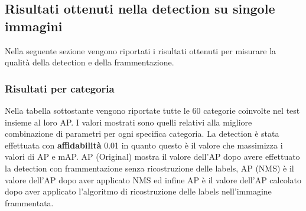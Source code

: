 \subsection{Risultati ottenuti nella detection su singole immagini}
Nella seguente sezione vengono riportati i risultati ottenuti per misurare la qualità della detection e della frammentazione.
\subsubsection{Risultati per categoria}
Nella tabella sottostante vengono riportate tutte le 60 categorie coinvolte nel test insieme al loro AP. I valori mostrati sono quelli relativi alla migliore combinazione di parametri per ogni specifica categoria. La detection è stata effettuata con \textbf{affidabilità} 0.01 in quanto questo è il valore che massimizza i valori di AP e mAP. AP (Original) mostra il valore dell'AP dopo avere effettuato la detection con frammentazione senza ricostruzione delle labels, AP (NMS) è il valore dell'AP dopo aver applicato NMS ed infine AP è il valore dell'AP calcolato dopo aver applicato l'algoritmo di ricostruzione delle labels nell'immagine frammentata.

